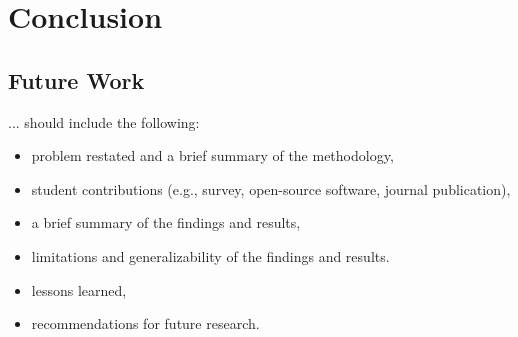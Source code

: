 \chapter{Conclusion\label{cha:chapter7}}

\section{Future Work}

... should include the following:
\begin{itemize}

\item problem restated and a brief summary of the methodology,
\item student contributions (e.g., survey, open-source software, journal publication),
\item a brief summary of the findings and results,
\item limitations and generalizability of the findings and results.
\item lessons learned,
\item recommendations for future research.

\end{itemize}

